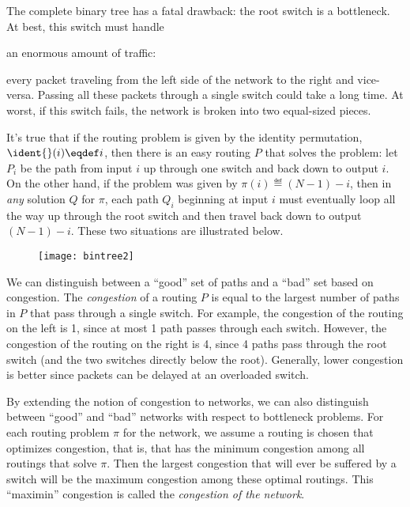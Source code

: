 The complete binary tree has a fatal drawback: the root switch is a
bottleneck.  At best, this switch must handle \begin{editingnotes}
an enormous amount of
traffic:
\end{editingnotes} every packet traveling from the left side of the network to the
right and vice-versa.  Passing all these packets through a single switch
could take a long time.  At worst, if this switch fails, the network is
broken into two equal-sized pieces.

It's true that if the routing problem is given by the identity permutation,
$\ident{}(i) \eqdef i$, then there is an easy routing $P$ that solves
the problem: let $P_i$ be the path from input $i$ up through one switch
and back down to output $i$.  On the other hand, if the problem was given
by $\pi(i) \eqdef (N - 1) - i$, then in \emph{any} solution $Q$ for
$\pi$, each path $Q_i$ beginning at input $i$ must eventually loop all
the way up through the root switch and then travel back down to output $(N
- 1) - i$.  These two situations are illustrated below.
\begin{figure}
\texttt{[image: bintree2]}
\end{figure}
We can distinguish between a ``good'' set of paths and a ``bad'' set based
on congestion.  The \emph{congestion}%
%
of a routing $P$ is equal to the
largest number of paths in $P$ that pass through a single switch.  For
example, the congestion of the routing on the left is 1, since at most 1
path passes through each switch.  However, the congestion of the routing
on the right is 4, since 4 paths pass through the root switch (and the two
switches directly below the root).  Generally, lower congestion is better
since packets can be delayed at an overloaded switch.

By extending the notion of congestion to networks, we can also distinguish
between ``good'' and ``bad'' networks with respect to bottleneck problems.
For each routing problem $\pi$ for the network, we assume a routing is
chosen that optimizes congestion, that is, that has the minimum congestion
among all routings that solve $\pi$.  Then the largest congestion that
will ever be suffered by a switch will be the maximum congestion among
these optimal routings.  This ``maximin'' congestion is called the
\emph{congestion of the network}.

